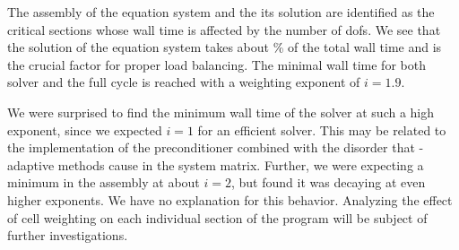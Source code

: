 The assembly of the equation system and the its solution are identified as the critical sections whose wall time is affected by the number of \glspl{dof}. We see that the solution of the equation system takes about \% of the total wall time and is the crucial factor for proper load balancing. The minimal wall time for both solver and the full cycle is reached with a weighting exponent of $i = 1.9$.

We were surprised to find the minimum wall time of the solver at such a high exponent, since we expected $i = 1$ for an efficient solver. This may be related to the implementation of the preconditioner combined with the disorder that \hp-adaptive methods cause in the system matrix. Further, we were expecting a minimum in the assembly at about $i = 2$, but found it was decaying at even higher exponents. We have no explanation for this behavior. Analyzing the effect of cell weighting on each individual section of the program
will be subject of further investigations.

